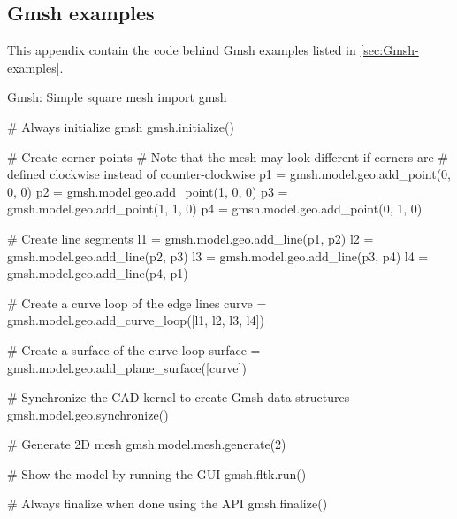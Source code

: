 \subsection{Gmsh examples}
\label{app:Gmsh-examples}
This appendix contain the code behind Gmsh examples listed in \autoref{sec:Gmsh-examples}.

\begin{python}[label=py:Gmshgrid, breakable]{Gmsh: Simple square mesh}
import gmsh

# Always initialize gmsh
gmsh.initialize()

# Create corner points
# Note that the mesh may look different if corners are
# defined clockwise instead of counter-clockwise
p1 = gmsh.model.geo.add_point(0, 0, 0)
p2 = gmsh.model.geo.add_point(1, 0, 0)
p3 = gmsh.model.geo.add_point(1, 1, 0)
p4 = gmsh.model.geo.add_point(0, 1, 0)

# Create line segments
l1 = gmsh.model.geo.add_line(p1, p2)
l2 = gmsh.model.geo.add_line(p2, p3)
l3 = gmsh.model.geo.add_line(p3, p4)
l4 = gmsh.model.geo.add_line(p4, p1)

# Create a curve loop of the edge lines
curve = gmsh.model.geo.add_curve_loop([l1, l2, l3, l4])

# Create a surface of the curve loop
surface = gmsh.model.geo.add_plane_surface([curve])

# Synchronize the CAD kernel to create Gmsh data structures
gmsh.model.geo.synchronize()

# Generate 2D mesh
gmsh.model.mesh.generate(2)

# Show the model by running the GUI
gmsh.fltk.run()

# Always finalize when done using the API
gmsh.finalize()
\end{python}



